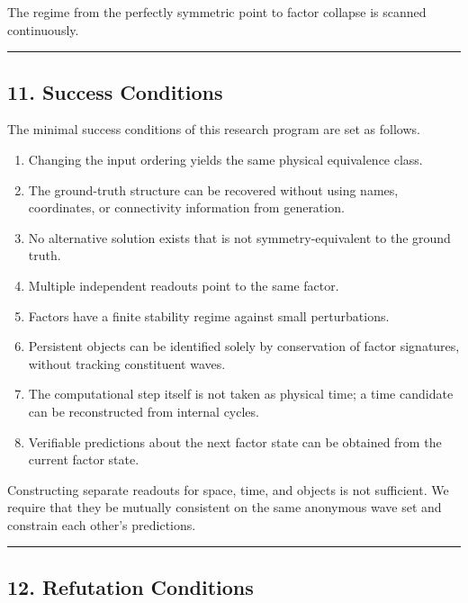 \documentclass[
  a4paper,
]{article}
\providecommand{\tightlist}{%
  \setlength{\itemsep}{0pt}\setlength{\parskip}{0pt}}
\begin{document}
The regime from the perfectly symmetric point to factor collapse is
scanned continuously.

\begin{center}\rule{0.5\linewidth}{0.5pt}\end{center}

\subsection{11. Success Conditions}\label{success-conditions}

The minimal success conditions of this research program are set as
follows.

\begin{enumerate}
\def\labelenumi{\arabic{enumi}.}
\tightlist
\item
  Changing the input ordering yields the same physical equivalence
  class.
\item
  The ground-truth structure can be recovered without using names,
  coordinates, or connectivity information from generation.
\item
  No alternative solution exists that is not symmetry-equivalent to the
  ground truth.
\item
  Multiple independent readouts point to the same factor.
\item
  Factors have a finite stability regime against small perturbations.
\item
  Persistent objects can be identified solely by conservation of factor
  signatures, without tracking constituent waves.
\item
  The computational step itself is not taken as physical time; a time
  candidate can be reconstructed from internal cycles.
\item
  Verifiable predictions about the next factor state can be obtained
  from the current factor state.
\end{enumerate}

Constructing separate readouts for space, time, and objects is not
sufficient. We require that they be mutually consistent on the same
anonymous wave set and constrain each other's predictions.

\begin{center}\rule{0.5\linewidth}{0.5pt}\end{center}

\subsection{12. Refutation Conditions}\label{refutation-conditions}
\end{document}
